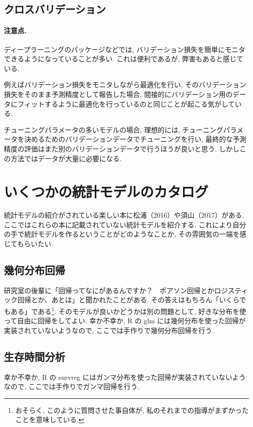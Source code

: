 \documentclass[a4paper, 12pt]{jarticle}
\begin{document}
\subsection{クロスバリデーション}

\paragraph{注意点.}
ディープラーニングのパッケージなどでは, バリデーション損失を簡単にモニタできるようになっていることが多い. これは便利であるが, 弊害もあると感じている.

例えばバリデーション損失をモニタしながら最適化を行い, そのバリデーション損失をそのまま予測精度として報告した場合, 間接的にバリデーション用のデータにフィットするように最適化を行っているのと同じことが起こる気がしている. 

チューニングパラメータの多いモデルの場合, 理想的には, チューニングパラメータを決めるためのバリデーションデータでチューニングを行い, 最終的な予測精度の評価はまた別のバリデーションデータで行うほうが良いと思う. しかしこの方法ではデータが大量に必要になる. 


\section{いくつかの統計モデルのカタログ}
\label{secCata}

統計モデルの紹介がされている楽しい本に松浦（2016）や須山（2017）がある.
ここではこれらの本に記載されていない統計モデルを紹介する. これにより自分の手で統計モデルを作るということがどのようなことか, その雰囲気の一端を感じてもらいたい. 

\subsection{幾何分布回帰}

研究室の後輩に「回帰ってなにがあるんですか？　ポアソン回帰とかロジスティック回帰とか、あとは」と聞かれたことがある. 
その答えはもちろん「いくらでもある」である\footnote{おそらく, このように質問させた事自体が, 私のそれまでの指導がまずかったことを意味している.}. そのモデルが良いかどうかは別の問題として, 好きな分布を使って自由に回帰をしてよい. 
幸か不幸か, R の glm には幾何分布を使った回帰が実装されていないようなので, ここでは手作りで幾何分布回帰を行う. 

\subsection{生存時間分析}
幸か不幸か, R の survreg にはガンマ分布を使った回帰が実装されていないようなので, ここでは手作りでガンマ回帰を行う. 
\end{document}
